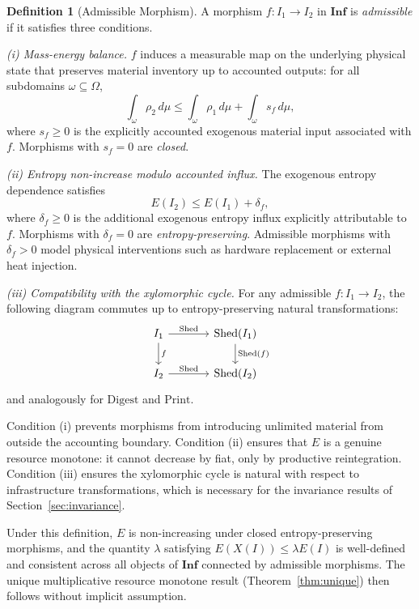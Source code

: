 \documentclass[10pt,twocolumn]{article}
\theoremstyle{plain}
\theoremstyle{definition}
\newtheorem{definition}[theorem]{Definition}
\theoremstyle{remark}
\begin{document}
\begin{definition}[Admissible Morphism]
\label{def:admissible}
A morphism $f : I_1 \to I_2$ in $\mathbf{Inf}$ is \emph{admissible} if
it satisfies three conditions.

\emph{(i) Mass-energy balance.} $f$ induces a measurable map on the
underlying physical state that preserves material inventory up to
accounted outputs: for all subdomains $\omega \subseteq \Omega$,
\[
  \int_\omega \rho_2 \,d\mu
  \leq \int_\omega \rho_1 \,d\mu + \int_\omega s_f \,d\mu,
\]
where $s_f \geq 0$ is the explicitly accounted exogenous material input
associated with $f$. Morphisms with $s_f = 0$ are \emph{closed}.

\emph{(ii) Entropy non-increase modulo accounted influx.} The
exogenous entropy dependence satisfies
\[
  E(I_2) \leq E(I_1) + \delta_f,
\]
where $\delta_f \geq 0$ is the additional exogenous entropy influx
explicitly attributable to $f$. Morphisms with $\delta_f = 0$ are
\emph{entropy-preserving}. Admissible morphisms with $\delta_f > 0$
model physical interventions such as hardware replacement or external
heat injection.

\emph{(iii) Compatibility with the xylomorphic cycle.} For any
admissible $f : I_1 \to I_2$, the following diagram commutes up to
entropy-preserving natural transformations:
\[
\begin{tikzcd}[column sep=large]
I_1 \arrow{r}{\mathrm{Shed}} \arrow{d}{f} &
\mathrm{Shed}(I_1) \arrow{d}{\mathrm{Shed}(f)} \\
I_2 \arrow{r}{\mathrm{Shed}} &
\mathrm{Shed}(I_2)
\end{tikzcd}
\]
and analogously for $\mathrm{Digest}$ and $\mathrm{Print}$.
\end{definition}

Condition (i) prevents morphisms from introducing unlimited material
from outside the accounting boundary. Condition (ii) ensures that $E$
is a genuine resource monotone: it cannot decrease by fiat, only by
productive reintegration. Condition (iii) ensures the xylomorphic cycle
is natural with respect to infrastructure transformations, which is
necessary for the invariance results of Section~\ref{sec:invariance}.

Under this definition, $E$ is non-increasing under closed
entropy-preserving morphisms, and the quantity $\lambda$ satisfying
$E(X(I)) \leq \lambda E(I)$ is well-defined and consistent across all
objects of $\mathbf{Inf}$ connected by admissible morphisms. The unique
multiplicative resource monotone result (Theorem~\ref{thm:unique})
then follows without implicit assumption.
\end{document}
